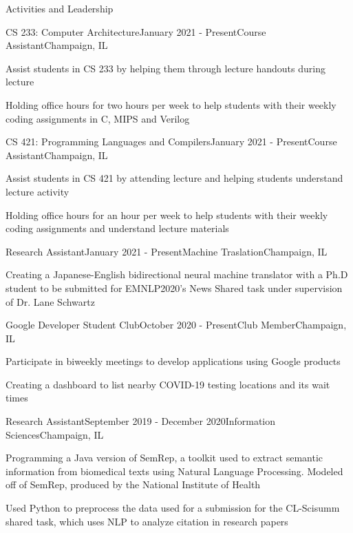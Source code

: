 \documentclass[10pt]{resume} %
\begin{document}
\begin{rSection}{Activities and Leadership}
\begin{rSubsection}{CS 233: Computer Architecture}{January 2021 - Present}{Course Assistant}{Champaign, IL}
\item \small Assist students in CS 233 by helping them through lecture handouts during lecture
\item \small Holding office hours for two hours per week to help students with their weekly coding assignments in C, MIPS and Verilog
\end{rSubsection}

\begin{rSubsection}{CS 421: Programming Languages and Compilers}{January 2021 - Present}{Course Assistant}{Champaign, IL}
\item \small Assist students in CS 421 by attending lecture and helping students understand lecture activity
\item \small Holding office hours for an hour per week to help students with their weekly coding assignments and understand lecture materials
\end{rSubsection}

\begin{rSubsection}{Research Assistant}{January 2021 - Present}{Machine Traslation}{Champaign, IL}
\item \small Creating a Japanese-English bidirectional neural machine translator with a Ph.D student to be submitted for EMNLP2020's News Shared task under supervision of Dr. Lane Schwartz

\end{rSubsection}

\begin{rSubsection}{Google Developer Student Club}{October 2020 - Present}{Club Member}{Champaign, IL}
\item \small Participate in biweekly meetings to develop applications using Google products
\item \small Creating a dashboard to list nearby COVID-19 testing locations and its wait times
\end{rSubsection}


\begin{rSubsection}{Research Assistant}{September 2019 - December 2020}{Information Sciences}{Champaign, IL}
\item \small Programming a Java version of SemRep, a toolkit used to extract semantic information from biomedical texts using Natural Language Processing. Modeled off of SemRep, produced by the National Institute of Health 
\item Used Python to preprocess the data used for a submission for the CL-Scisumm shared task, which uses NLP to analyze citation in research papers
\end{rSubsection}


\end{rSection}
\end{document}
